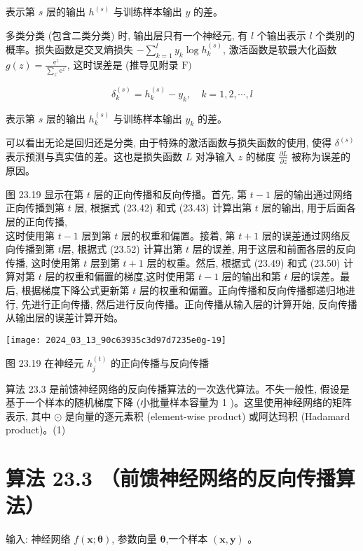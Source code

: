 \documentclass[10pt]{article}
\begin{document}
\begin{CJK*}{UTF8}{bsmi}
表示第 $s$ 层的输出 $h^{(s)}$ 与训练样本输出 $y$ 的差。

多类分类 (包含二类分类) 时, 输出层只有一个神经元, 有 $l$ 个输出表示 $l$ 个类别的概率。损失函数是交叉熵损失 $-\sum_{k=1}^{l} y_{k} \log h_{k}^{(s)}$, 激活函数是软最大化函数 $g(z)=\frac{\mathrm{e}^{z}}{\sum_{z^{\prime}} \mathrm{e}^{z^{\prime}}}$, 这时误差是 (推导见附录 $\mathrm{F})$


\begin{equation*}
\delta_{k}^{(s)}=h_{k}^{(s)}-y_{k}, \quad k=1,2, \cdots, l \tag{23.56}
\end{equation*}


表示第 $s$ 层的输出 $h_{k}^{(s)}$ 与训练样本输出 $y_{k}$ 的差。

可以看出无论是回归还是分类, 由于特殊的激活函数与损失函数的使用, 使得 $\delta^{(s)}$ 表示预测与真实值的差。这也是损失函数 $L$ 对净输入 $z$ 的梯度 $\frac{\partial L}{\partial z}$ 被称为误差的原因。

图 23.19 显示在第 $t$ 层的正向传播和反向传播。首先, 第 $t-1$ 层的输出通过网络正向传播到第 $t$ 层, 根据式 (23.42) 和式 (23.43) 计算出第 $t$ 层的输出, 用于后面各层的正向传播,\\
这时使用第 $t-1$ 层到第 $t$ 层的权重和偏置。接着, 第 $t+1$ 层的误差通过网络反向传播到第 $t$层, 根据式 (23.52) 计算出第 $t$ 层的误差, 用于这层和前面各层的反向传播, 这时使用第 $t$ 层到第 $t+1$ 层的权重。然后, 根据式 (23.49) 和式 (23.50) 计算对第 $t$ 层的权重和偏置的梯度,这时使用第 $t-1$ 层的输出和第 $t$ 层的误差。最后, 根据梯度下降公式更新第 $t$ 层的权重和偏置。正向传播和反向传播都递归地进行, 先进行正向传播, 然后进行反向传播。正向传播从输入层的计算开始, 反向传播从输出层的误差计算开始。

\begin{center}
\texttt{[image: 2024\_03\_13\_90c63935c3d97d7235e0g-19]}
\end{center}

图 23.19 在神经元 $h_{j}^{(t)}$ 的正向传播与反向传播

算法 23.3 是前馈神经网络的反向传播算法的一次迭代算法。不失一般性, 假设是基于一个样本的随机梯度下降 (小批量样本容量为 1 )。这里使用神经网络的矩阵表示, 其中 $\odot$ 是向量的逐元素积 (element-wise product) 或阿达玛积 (Hadamard product)。(1)

\section*{算法 23.3 （前馈神经网络的反向传播算法）}
输入: 神经网络 $f(\boldsymbol{x} ; \boldsymbol{\theta})$, 参数向量 $\boldsymbol{\theta}$,一个样本 $(\boldsymbol{x}, \boldsymbol{y})$ 。


\end{CJK*}
\end{document}
